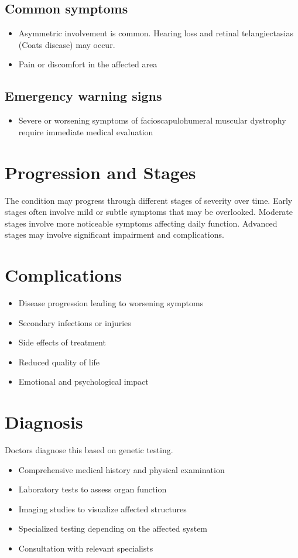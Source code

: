 \subsection{Common symptoms}
\begin{itemize}[noitemsep]
  \item Asymmetric involvement is common. Hearing loss and retinal telangiectasias (Coats disease) may occur.

  \item Pain or discomfort in the affected area
  \end{itemize}

\subsection{Emergency warning signs}
\begin{itemize}[noitemsep]
  \item Severe or worsening symptoms of facioscapulohumeral muscular dystrophy require immediate medical evaluation
\end{itemize}
\section{Progression and Stages}
The condition may progress through different stages of severity over time. Early stages often involve mild or subtle symptoms that may be overlooked. Moderate stages involve more noticeable symptoms affecting daily function. Advanced stages may involve significant impairment and complications.
\section{Complications}
\begin{itemize}[noitemsep]
  \item Disease progression leading to worsening symptoms
  \item Secondary infections or injuries
  \item Side effects of treatment
  \item Reduced quality of life
  \item Emotional and psychological impact
\end{itemize}
\section{Diagnosis}
Doctors diagnose this based on genetic testing.

\begin{itemize}[noitemsep]
  \item Comprehensive medical history and physical examination
  \item Laboratory tests to assess organ function
  \item Imaging studies to visualize affected structures
  \item Specialized testing depending on the affected system
  \item Consultation with relevant specialists
\end{itemize}
